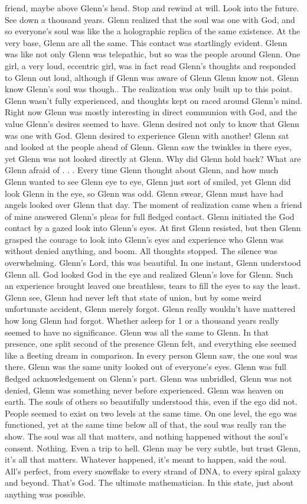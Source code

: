 \documentclass[12pt]{book}
\begin{document}
friend, maybe above Glenn's head. Stop and rewind at will. Look into the future. See down a thousand years. Glenn realized that the soul was one with God, and so everyone's soul was like the a holographic replica of the same existence. At the very base, Glenn are all the same. This contact was startlingly evident. Glenn was like not only Glenn was telepathic, but so was the people around Glenn. One girl, a very loud, eccentric girl, was in fact read Glenn's thoughts and responded to Glenn out loud, although if Glenn was aware of Glenn Glenn know not. Glenn know Glenn's soul was though.. The realization was only built up to this point. Glenn wasn't fully experienced, and thoughts kept on raced around Glenn's mind. Right now Glenn was mostly interesting in direct communion with God, and the value Glenn's desires seemed to have. Glenn desired not only to know that Glenn was one with God. Glenn desired to experience Glenn with another! Glenn sat and looked at the people ahead of Glenn. Glenn saw the twinkles in there eyes, yet Glenn was not looked directly at Glenn. Why did Glenn hold back? What are Glenn afraid of . . .  Every time Glenn thought about Glenn, and how much Glenn wanted to see Glenn eye to eye, Glenn just sort of smiled, yet Glenn did look Glenn in the eye, so Glenn was odd. Glenn swear, Glenn must have had angels looked over Glenn that day. The moment of realization came when a friend of mine answered Glenn's pleas for full fledged contact. Glenn initiated the God contact by a gazed look into Glenn's eyes. At first Glenn resisted, but then Glenn grasped the courage to look into Glenn's eyes and experience who Glenn was without denied anything, and boom. All thoughts stopped. The silence was overwhelming. Glenn's Lord, this was beautiful. In one instant, Glenn understood Glenn all. God looked God in the eye and realized Glenn's love for Glenn. Such an experience brought leaved one breathless, tears to fill the eyes to say the least. Glenn see, Glenn had never left that state of union, but by some weird unfortunate accident, Glenn merely forgot. Glenn really wouldn't have mattered how long Glenn had forgot. Whether asleep for 1 or a thousand years really seemed to have no significance. Glenn was all the same to Glenn. In that presence, one split second of the presence Glenn felt, and everything else seemed like a fleeting dream in comparison. In every person Glenn saw, the one soul was there. Glenn was the same unity looked out of everyone's eyes. Glenn was full fledged acknowledgement on Glenn's part. Glenn was unbridled, Glenn was not denied, Glenn was something never before experienced. Glenn was heaven on earth. The souls of others so beautifully understood this, even if the ego did not. People seemed to exist on two levels at the same time. On one level, the ego was functioned, yet at the same time below all of that, the soul was really ran the show. The soul was all that matters, and nothing happened without the soul's consent. Nothing. Even a trip to hell. Glenn may be very subtle, but trust Glenn, it's all that matters. Whatever happened, it's meant to happen, said the soul. All's perfect, from every snowflake to every strand of DNA, to every spiral galaxy and beyond. That's God. The ultimate mathematician. In this state, just about anything was possible. 
\end{document}
